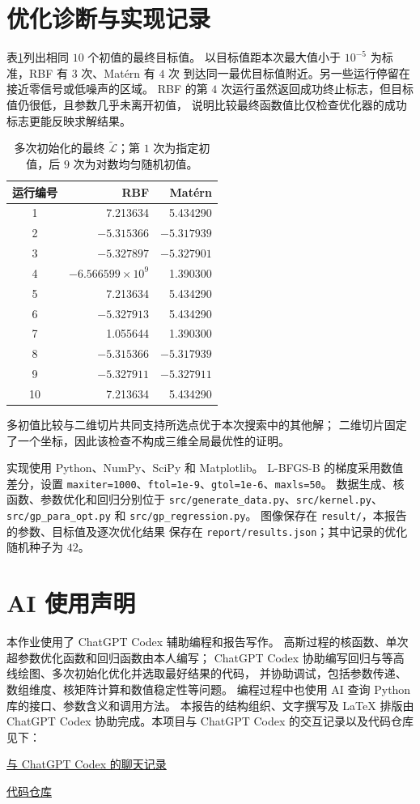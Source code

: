 \documentclass[UTF8,a4paper,11pt,fontset=fandol]{ctexart}
\newcommand{\score}{\widetilde{\mathcal L}}
\begin{document}
\clearpage
\section{优化诊断与实现记录}
表\ref{tab:runs}列出相同 $10$ 个初值的最终目标值。
以目标值距本次最大值小于 $10^{-5}$ 为标准，RBF 有 $3$ 次、Mat\'ern 有 $4$ 次
到达同一最优目标值附近。另一些运行停留在接近零信号或低噪声的区域。
RBF 的第 $4$ 次运行虽然返回成功终止标志，但目标值仍很低，且参数几乎未离开初值，
说明比较最终函数值比仅检查优化器的成功标志更能反映求解结果。

\begin{table}[H]
 \centering\small
 \caption{多次初始化的最终 $\score$；第 $1$ 次为指定初值，后 $9$ 次为对数均匀随机初值。}\label{tab:runs}
 \begin{tabular}{crr}
 \toprule 运行编号 & RBF & Mat\'ern \\
 \midrule
 1 & 7.213634 & 5.434290 \\
 2 & $-5.315366$ & $-5.317939$ \\
 3 & $-5.327897$ & $-5.327901$ \\
 4 & $-6.566599\times10^9$ & 1.390300 \\
 5 & 7.213634 & 5.434290 \\
 6 & $-5.327913$ & 5.434290 \\
 7 & 1.055644 & 1.390300 \\
 8 & $-5.315366$ & $-5.317939$ \\
 9 & $-5.327911$ & $-5.327911$ \\
 10 & 7.213634 & 5.434290 \\
 \bottomrule
 \end{tabular}
\end{table}
多初值比较与二维切片共同支持所选点优于本次搜索中的其他解；
二维切片固定了一个坐标，因此该检查不构成三维全局最优性的证明。

实现使用 Python、NumPy、SciPy 和 Matplotlib。
L-BFGS-B 的梯度采用数值差分，设置
\texttt{maxiter=1000}、\texttt{ftol=1e-9}、\texttt{gtol=1e-6}、\texttt{maxls=50}。
数据生成、核函数、参数优化和回归分别位于
\texttt{src/generate\_data.py}、\texttt{src/kernel.py}、
\texttt{src/gp\_para\_opt.py} 和 \texttt{src/gp\_regression.py}。
图像保存在 \texttt{result/}，本报告的参数、目标值及逐次优化结果
保存在 \texttt{report/results.json}；其中记录的优化随机种子为 $42$。

\section*{AI 使用声明}
本作业使用了 ChatGPT Codex 辅助编程和报告写作。
高斯过程的核函数、单次超参数优化函数和回归函数由本人编写；
ChatGPT Codex 协助编写回归与等高线绘图、多次初始化优化并选取最好结果的代码，
并协助调试，包括参数传递、数组维度、核矩阵计算和数值稳定性等问题。
编程过程中也使用 AI 查询 Python 库的接口、参数含义和调用方法。
本报告的结构组织、文字撰写及 LaTeX 排版由 ChatGPT Codex 协助完成。本项目与 ChatGPT Codex 的交互记录以及代码仓库见下：


\href{https://chatgpt.com/s/cx_6b007d9cdfa081919bf306ca07950faa}{与 ChatGPT Codex 的聊天记录} 

\href{https://github.com/Baojun-Che/PKU-courses/tree/main/SciML/GaussianRegression}{代码仓库}
\end{document}
